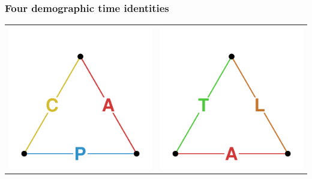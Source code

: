 \documentclass[20pt]{beamer}
\begin{document}
\begin{frame}
\frametitle{Four demographic time identities}
\vspace{-4em}
\begin{center}
\begin{tabular}{c c}
     \includegraphics[scale=.8]{Figures/APCid.pdf} &
     \includegraphics[scale=.8]{Figures/TALid.pdf} \\

\end{tabular}
\end{center}
\end{frame}
\end{document}
